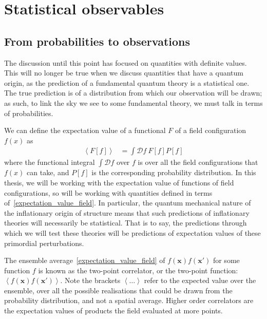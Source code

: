 

\section{Statistical observables}
\subsection{From probabilities to observations}\label{corr_functions}
    The discussion until this point has focused on quantities
    with definite values. This will no longer
    be true when we discuss quantities that have a quantum origin, as
    the prediction of a fundamental quantum theory is a statistical one.
    The true prediction is of a distribution from which our observation will be drawn;
    as such, to link the sky we see to some fundamental theory,
    we must talk in terms of probabilities.


    We can define the expectation value of a functional $F$ of a field configuration $f(x)$ as
    \begin{align}
        \left<F\left[f\right]\right> &= \int \mathcal{D}f~F\left[f\right] P\left[f\right]\label{expectation_value_field}
    \end{align}
    where the functional integral $\int \mathcal{D}f$ over $f$ is over all the field configurations
    that $f(x)$ can take, and $P\left[f\right]$ is the corresponding probability distribution.
    In this thesis, we will be working with the expectation value of
    functions of field configurations, so will be working with quantities
    defined in terms of~\eqref{expectation_value_field}.
    In particular, the quantum mechanical nature of the inflationary
    origin of structure means that such predictions
    of inflationary theories will necessarily be statistical. That is to say, the predictions through
    which we will test these theories will be predictions of expectation
    values of these primordial perturbations.


    The ensemble average~\eqref{expectation_value_field} of
    $f(\mathbf{x})f(\mathbf{x'})$ for some function $f$ is known as the
    two-point correlator, or the two-point function: $\left<f(\mathbf{x})f(\mathbf{x'})\right>$.
    Note the brackets $\left<\ldots\right>$ refer to the expected value over the ensemble,
    over all the possible realisations that could be drawn from the probability
    distribution, and not a spatial average.
    Higher order correlators are the
    expectation values of products the field evaluated at more points.


